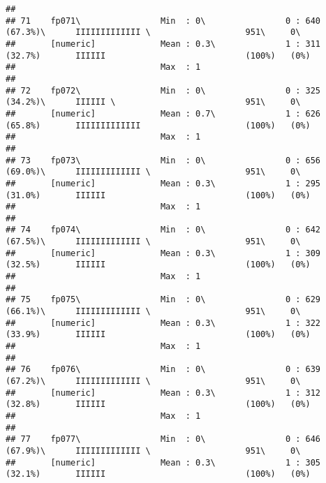 \documentclass[]{article}
\begin{document}
\begin{verbatim}
## 
## 71    fp071\                Min  : 0\                0 : 640 (67.3%)\      IIIIIIIIIIIII \                   951\     0\       
##       [numeric]             Mean : 0.3\              1 : 311 (32.7%)       IIIIII                            (100%)   (0%)     
##                             Max  : 1                                                                                           
## 
## 72    fp072\                Min  : 0\                0 : 325 (34.2%)\      IIIIII \                          951\     0\       
##       [numeric]             Mean : 0.7\              1 : 626 (65.8%)       IIIIIIIIIIIII                     (100%)   (0%)     
##                             Max  : 1                                                                                           
## 
## 73    fp073\                Min  : 0\                0 : 656 (69.0%)\      IIIIIIIIIIIII \                   951\     0\       
##       [numeric]             Mean : 0.3\              1 : 295 (31.0%)       IIIIII                            (100%)   (0%)     
##                             Max  : 1                                                                                           
## 
## 74    fp074\                Min  : 0\                0 : 642 (67.5%)\      IIIIIIIIIIIII \                   951\     0\       
##       [numeric]             Mean : 0.3\              1 : 309 (32.5%)       IIIIII                            (100%)   (0%)     
##                             Max  : 1                                                                                           
## 
## 75    fp075\                Min  : 0\                0 : 629 (66.1%)\      IIIIIIIIIIIII \                   951\     0\       
##       [numeric]             Mean : 0.3\              1 : 322 (33.9%)       IIIIII                            (100%)   (0%)     
##                             Max  : 1                                                                                           
## 
## 76    fp076\                Min  : 0\                0 : 639 (67.2%)\      IIIIIIIIIIIII \                   951\     0\       
##       [numeric]             Mean : 0.3\              1 : 312 (32.8%)       IIIIII                            (100%)   (0%)     
##                             Max  : 1                                                                                           
## 
## 77    fp077\                Min  : 0\                0 : 646 (67.9%)\      IIIIIIIIIIIII \                   951\     0\       
##       [numeric]             Mean : 0.3\              1 : 305 (32.1%)       IIIIII                            (100%)   (0%)     

\end{verbatim}
\end{document}
